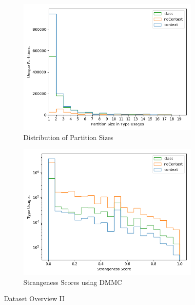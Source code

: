 \begin{figure}[t]
    \centering
    \begin{subfigure}[h]{0.49\textwidth}
        \centering
        \includegraphics[width=\textwidth]{figures/graph_tus_partition}
        \caption{Distribution of Partition Sizes}\label{fig:tus_partition}
    \end{subfigure}
    \begin{subfigure}[h]{0.49\textwidth}
        \centering
        \includegraphics[width=\textwidth]{figures/graph_strangeness}
        \caption{Strangeness Scores using $\text{DMMC}$}\label{fig:strangeness}
    \end{subfigure}
    \caption{Dataset Overview II}
\end{figure}

